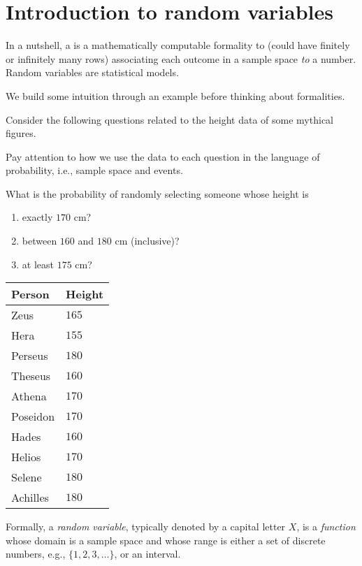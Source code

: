 \documentclass[../main.tex]{subfiles}
\begin{document}
 \section{Introduction to random variables}

In a nutshell, a  is a mathematically computable formality to  (could have finitely or infinitely many rows) associating each outcome in a sample space \emph{to} a number.  Random variables are statistical models.

We build some intuition through an example before thinking about formalities. 

\begin{example} \label{ex:random-variable-intro}
  Consider the following questions related to the height data of some mythical figures.

  Pay attention to how we use the data to  each question in the language of probability, i.e., sample space and events.

  {\color{main}
    What is the probability of randomly selecting someone whose height is 
    \begin{enumerate}
      \item exactly \(170\) cm?
      \item between \(160\) and \(180\) cm (inclusive)?
      \item at least \(175\) cm?
    \end{enumerate}
  }

  \hfill{}
  \begin{tabular}{l|l}
    Person & Height \\\midrule
    Zeus & \(165\) \\
    Hera & \(155\) \\
    Perseus & \(180\) \\
    Theseus & \(160\) \\
    Athena & \(170\) \\
    Poseidon  & \(170\) \\
    Hades & \(160\) \\
    Helios & \(170\) \\
    Selene & \(180\) \\
    Achilles & \(180\)
  \end{tabular}

\end{example}
\clearpage

Formally, a \emph{random variable}, typically denoted by a capital letter \(X\), is a \emph{function} whose domain is a sample space and whose range is either a set of discrete numbers, e.g., \(\{1,2,3,\ldots\}\), or an interval. 
\end{document}

